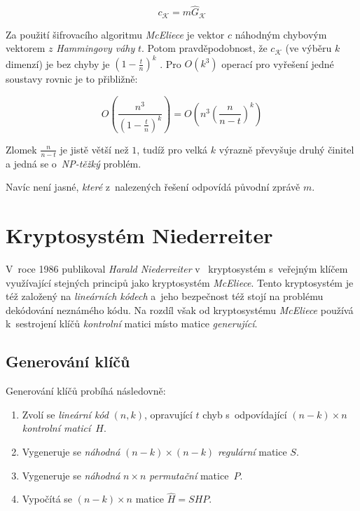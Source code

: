 \documentclass[thesis=M,czech,hidelinks]{FITthesis}[2012/06/26]
\newcommand{\0}{{\textcolor[gray]{0.80}{0}}}
\begin{document}
$$ c_{\mathcal{K}} = m \hat{G}_{\mathcal{K}} $$

Za použití šifrovacího algoritmu \emph{McEliece} je vektor $c$ 
náhodným chybovým vektorem $z$ \emph{Hammingovy váhy} $t$. Potom
pravděpodobnost, že $c_{\mathcal{K}}$ (ve výběru $k$ dimenzí) je bez chyby je
$\left(1-\frac{t}{n}\right)^k$ \cite{McEliece}. Pro $O\left(k^3\right)$ operací
pro vyřešení jedné soustavy rovnic je to přibližně:

$$
    O\left( \frac{n^3}{\left(1-\frac{t}{n}\right)^k} \right) =
    O\left( n^3 \left(\frac{n}{n-t}\right)^k \right)
$$

Zlomek $\frac{n}{n-t}$ je jistě větší než $1$, tudíž pro velká $k$ výrazně
převyšuje druhý činitel a jedná se o~\emph{NP-těžký} problém.

Navíc není jasné, \emph{které} z~nalezených řešení odpovídá původní zprávě $m$.

\section{Kryptosystém Niederreiter}

V~roce 1986 publikoval \emph{Harald Niederreiter} v~\cite{Niederreiter}
kryptosystém s~veřejným klíčem využívající stejných principů jako kryptosystém
\emph{McEliece}. Tento kryptosystém je též založený na \emph{lineárních kódech}
a~jeho bezpečnost též stojí na problému dekódování neznámého kódu. Na rozdíl
však od kryptosystému \emph{McEliece} používá k~sestrojení klíčů
\emph{kontrolní} matici místo matice \emph{generující}.

\subsection{Generování klíčů}

Generování klíčů probíhá následovně:

\begin{enumerate}
    \item Zvolí se \emph{lineární kód} $(n,k)$, opravující $t$ chyb
        s~odpovídající $(n-k) \times n$ \emph{kontrolní maticí}~$H$.
    \item Vygeneruje se \emph{náhodná} $(n-k) \times (n-k)$ \emph{regulární}
        matice $S$.
    \item Vygeneruje se \emph{náhodná} $n \times n$ \emph{permutační}
        matice~$P$.
    \item Vypočítá se $(n-k) \times n$ matice $\hat{H} = S H P$.
\end{enumerate}
\end{document}
